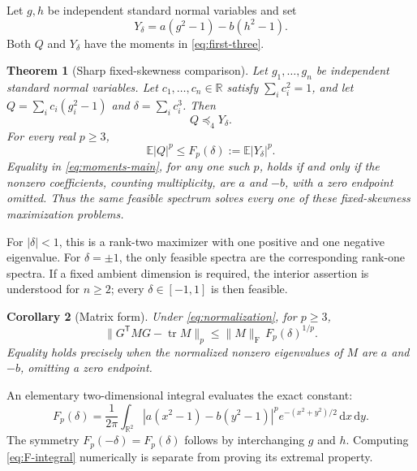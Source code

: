 \documentclass[11pt]{article}
\numberwithin{equation}{section}
\newtheorem{theorem}{Theorem}[section]
\newtheorem{corollary}[theorem]{Corollary}
\theoremstyle{definition}
\theoremstyle{remark}
\newcommand{\E}{\mathbb E}
\newcommand{\R}{\mathbb R}
\newcommand{\tr}{\operatorname{tr}}
\newcommand{\Frob}{\mathrm F}
\newcommand{\dd}{\,\mathrm d}
\begin{document}
Let $g,h$ be independent standard normal variables and set
\begin{equation}\label{eq:Y}
Y_\delta=a(g^2-1)-b(h^2-1).
\end{equation}
Both $Q$ and $Y_\delta$ have the moments in \eqref{eq:first-three}.

\begin{theorem}[Sharp fixed-skewness comparison]\label{thm:main}
Let $g_1,\ldots,g_n$ be independent standard normal variables. Let $c_1,\ldots,c_n\in\R$ satisfy $\sum_i c_i^2=1$, and let
$Q=\sum_i c_i(g_i^2-1)$ and $\delta=\sum_i c_i^3$. Then
\begin{equation}\label{eq:order}
Q\preceq_4 Y_\delta.
\end{equation}
For every real $p\geq3$,
\begin{equation}\label{eq:moments-main}
\E|Q|^p\leq F_p(\delta):=\E|Y_\delta|^p.
\end{equation}
Equality in \eqref{eq:moments-main}, for any one such $p$, holds if and only if the nonzero coefficients, counting multiplicity, are $a$ and $-b$, with a zero endpoint omitted. Thus the same feasible spectrum solves every one of these fixed-skewness maximization problems.
\end{theorem}

For $|\delta|<1$, this is a rank-two maximizer with one positive and one negative eigenvalue. For $\delta=\pm1$, the only feasible spectra are the corresponding rank-one spectra. If a fixed ambient dimension is required, the interior assertion is understood for $n\geq2$; every $\delta\in[-1,1]$ is then feasible.

\begin{corollary}[Matrix form]\label{cor:matrix}
Under \eqref{eq:normalization}, for $p\geq3$,
\[
\|G^{\mathsf T}MG-\tr M\|_p
\leq \|M\|_{\Frob}\,F_p(\delta)^{1/p}.
\]
Equality holds precisely when the normalized nonzero eigenvalues of $M$ are $a$ and $-b$, omitting a zero endpoint.
\end{corollary}

An elementary two-dimensional integral evaluates the exact constant:
\begin{equation}\label{eq:F-integral}
F_p(\delta)=\frac1{2\pi}\int_{\R^2}
\left|a(x^2-1)-b(y^2-1)\right|^p e^{-(x^2+y^2)/2}\dd x\dd y.
\end{equation}
The symmetry $F_p(-\delta)=F_p(\delta)$ follows by interchanging $g$ and $h$. Computing \eqref{eq:F-integral} numerically is separate from proving its extremal property.
\end{document}
